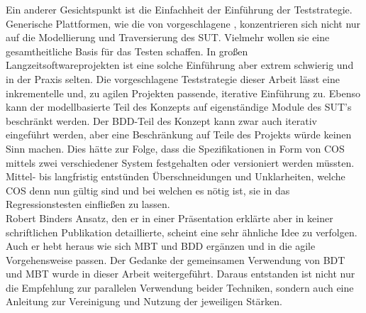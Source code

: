 Ein anderer Gesichtspunkt ist die Einfachheit der Einführung der Teststrategie. Generische Plattformen, wie die von \citeauthor{zech_generic_2012} vorgeschlagene \cite{zech_generic_2012}, konzentrieren sich nicht nur auf die Modellierung und Traversierung des \Gls{SUT}. Vielmehr wollen sie eine gesamtheitliche Basis für das Testen schaffen. In großen Langzeitsoftwareprojekten ist eine solche Einführung aber extrem schwierig und in der Praxis selten. Die vorgeschlagene Teststrategie dieser Arbeit lässt eine inkrementelle und, zu agilen Projekten passende, iterative Einführung zu. Ebenso kann der modellbasierte Teil des Konzepts auf eigenständige Module des \Gls{SUT}'s beschränkt werden. Der BDD-Teil des Konzept kann zwar auch iterativ eingeführt werden, aber eine Beschränkung auf Teile des Projekts würde keinen Sinn machen. Dies hätte zur Folge, dass die Spezifikationen in Form von \Gls{COS} mittels zwei verschiedener System festgehalten oder versioniert werden müssten. Mittel- bis langfristig entstünden Überschneidungen und Unklarheiten, welche \Gls{COS} denn nun gültig sind und bei welchen es nötig ist, sie in das Regressionstesten einfließen zu lassen.\\
Robert Binders Ansatz, den er in einer Präsentation \cite{binder_model-based_2014} erklärte aber in keiner schriftlichen Publikation detaillierte, scheint eine sehr ähnliche Idee zu verfolgen. Auch er hebt heraus wie sich \Gls{MBT} und \Gls{BDD} ergänzen und in die agile Vorgehensweise passen. Der Gedanke der gemeinsamen Verwendung von \Gls{BDT} und \Gls{MBT} wurde in dieser Arbeit weitergeführt. Daraus entstanden ist nicht nur die Empfehlung zur parallelen Verwendung beider Techniken, sondern auch eine Anleitung zur Vereinigung und Nutzung der jeweiligen Stärken.


